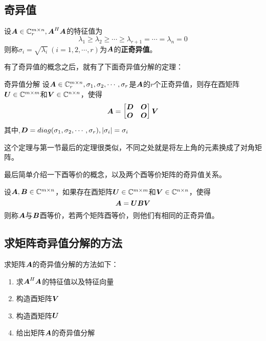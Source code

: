 \documentclass[12pt, a4paper, oneside, UTF8]{ctexbook}
\begin{document}
\subsection{奇异值}
\begin{defn}{}{}
    设$\boldsymbol{A}\in\mathbb{C}^{m\times n}_r,\boldsymbol{A}^H\boldsymbol{A}$的特征值为\[\lambda_1\geq\lambda_2\geq\cdots\geq\lambda_{r+1}=\cdots=\lambda_n=0\]则称$\sigma_i=\sqrt{\lambda_i}\ (i=1,2,\cdots,r)$为$\boldsymbol{A}$的\textbf{正奇异值}。
\end{defn}

有了奇异值的概念之后，就有了下面奇异值分解的定理：
\begin{them}{奇异值分解}{}
    设$\boldsymbol{A}\in\mathbb{C}_r^{m\times n},\sigma_1,\sigma_2,\cdots,\sigma_r$是$\boldsymbol{A}$的$r$个正奇异值，则存在酉矩阵$\boldsymbol{U}\in\mathbb{C}^{m\times m}$和$\boldsymbol{V}\in\mathbb{C}^{n\times n}$，使得\[\boldsymbol{A}=\begin{bmatrix}
        \boldsymbol{D}&\boldsymbol{O}\\
        \boldsymbol{O}&\boldsymbol{O}
    \end{bmatrix}\boldsymbol{V}\]其中,$\boldsymbol{D}=diag(\sigma_1,\sigma_2,\cdots,\sigma_r),|\sigma_i|=\sigma_i$
\end{them}

这个定理与第一节最后的定理很类似，不同之处就是将左上角的元素换成了对角矩阵。

最后简单介绍一下酉等价的概念，以及两个酉等价矩阵的奇异值关系。
\begin{defn}{}{}
    设$\boldsymbol{A},\boldsymbol{B}\in\mathbb{C}^{m\times n}$，如果存在酉矩阵$\boldsymbol{U}\in\mathbb{C}^{m\times m}$和$\boldsymbol{V}\in\mathbb{C}^{n\times n}$，使得\[\boldsymbol{A}=\boldsymbol{U}\boldsymbol{B}\boldsymbol{V}\]则称$\boldsymbol{A}$与$\boldsymbol{B}$酉等价，若两个矩阵酉等价，则他们有相同的正奇异值。
\end{defn}
\subsection{求矩阵奇异值分解的方法}
求矩阵$\boldsymbol{A}$的奇异值分解的方法如下：
\begin{enumerate}[leftmargin=4em]
    \item 求$\boldsymbol{A}^H\boldsymbol{A}$的特征值以及特征向量
    \item 构造酉矩阵$\boldsymbol{V}$
    \item 构造酉矩阵$\boldsymbol{U}$
    \item 给出矩阵$\boldsymbol{A}$的奇异值分解
\end{enumerate}


\ifx\allfiles\undefined
\end{document}
